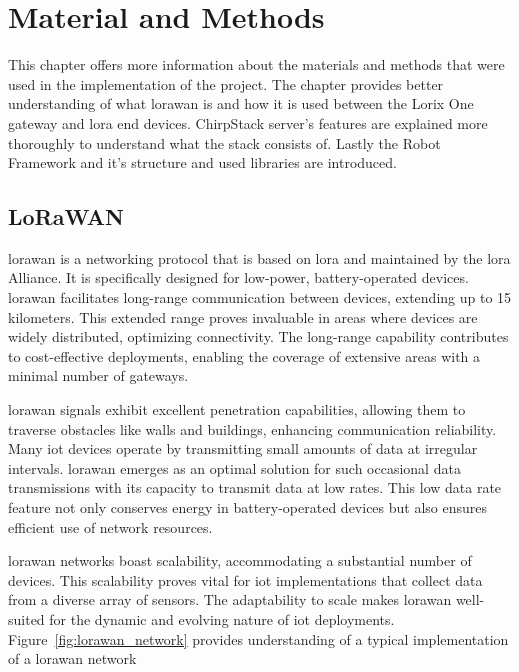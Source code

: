 
\chapter{Material and Methods} \label{ch:mat_met}

This chapter offers more information about the materials and methods that were used in the implementation of the project.
The chapter provides better understanding of what \gls{lorawan} is and how it is used between the Lorix One gateway and \gls{lora} end devices.
ChirpStack server's features are explained more thoroughly to understand what the stack consists of. 
Lastly the Robot Framework and it's structure and used libraries are introduced.

\section{LoRaWAN}
\gls{lorawan} is a networking protocol that is based on \gls{lora} and maintained by the \gls{lora} Alliance\cite{loraAlliance:aboutLorawan}.
It is specifically designed for low-power, battery-operated devices.
\gls{lorawan} facilitates long-range communication between devices, extending up to 15 kilometers.
This extended range proves invaluable in areas where devices are widely distributed, optimizing connectivity.
The long-range capability contributes to cost-effective deployments, enabling the coverage of extensive areas with a minimal number of gateways.

\gls{lorawan} signals exhibit excellent penetration capabilities, allowing them to traverse obstacles like walls and buildings, enhancing communication reliability.
Many \gls{iot} devices operate by transmitting small amounts of data at irregular intervals.
\gls{lorawan} emerges as an optimal solution for such occasional data transmissions with its capacity to transmit data at low rates.
This low data rate feature not only conserves energy in battery-operated devices but also ensures efficient use of network resources.

\gls{lorawan} networks boast scalability, accommodating a substantial number of devices.
This scalability proves vital for \gls{iot} implementations that collect data from a diverse array of sensors.
The adaptability to scale makes \gls{lorawan} well-suited for the dynamic and evolving nature of \gls{iot} deployments.
Figure~\ref{fig:lorawan_network} provides understanding of a typical implementation of a \gls{lorawan} network


